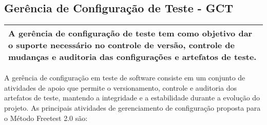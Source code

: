 




\subsection{ Gerência de Configuração de Teste - GCT }
\label{sec:gct}

\begin{table}[H]
\centering
\begin{tabular}{|p{130mm}|}
\hline
A gerência de configuração de teste tem como objetivo dar o suporte necessário no controle de versão, controle de mudanças e auditoria das configurações e artefatos de teste. \\ 
\hline
\end{tabular}
\end{table}

A gerência de configuração em teste de software consiste em um conjunto de atividades de apoio que permite o versionamento, controle e auditoria dos artefatos de teste, mantendo a integridade e a estabilidade durante a evolução do projeto. As principais atividades de gerenciamento de configuração proposta para o Método Freetest 2.0 são:

